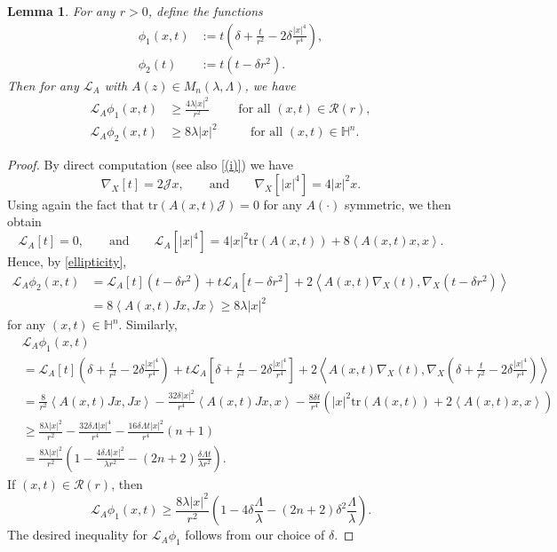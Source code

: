 \documentclass[12pt]{amsart}
\newtheorem{Lemma}[Theorem]{Lemma}
\newcommand{\Lop}{\mathcal{L}}
\newcommand{\J}{\mathcal{J}}
\def \tr {\mathrm{tr}}
\def \H {{\mathbb H}}
\def \L {\mathcal{L}}
\def \r {\mathcal R}
\def \tr {\mathrm{tr}}
\begin{document}
\begin{Lemma}\label{barriers}
For any $r>0$, define the functions
\begin{align*}
\phi_1(x,t) &:=t\left( \delta + \frac{t}{r^2} -2\delta \frac{|x|^4}{r^4}\right),\\
\phi_2(t)&:=t\left(t - \delta r^2 \right).
\end{align*}
Then for any $\L_A$ with $A(z) \in M_n(\lambda,\Lambda)$, we have
\begin{align*}
\Lop_A \phi_1(x,t)  &\geq \frac{4 \lambda |x|^2}{r^2} \qquad \text{ for all } (x,t) \in \r(r),\\
\Lop_A \phi_2(x,t) & \geq 8 \lambda |x|^2 \qquad\,\,\,\, \text{for all } (x,t) \in \H^n.
\end{align*}
\end{Lemma}
\begin{proof}
By direct computation (see also \eqref{(i)}) we have 
$$
\nabla_X [t]=2 \J x, \qquad \text{and} \qquad \nabla_X[|x|^4]=4 |x|^2 x.
$$
Using again the fact that $\tr(A(x,t) \J)=0$ for any $A(\cdot)$ symmetric, we then obtain
$$
\Lop_A [t]=0,  \qquad \text{and} \qquad\Lop_A\left[|x|^4\right]=4|x|^2\tr(A(x,t))+ 8\left\langle A(x,t)x,x\right\rangle.
$$
Hence, by \eqref{ellipticity},
\begin{align*}
\Lop_A \phi_2(x,t) & = \Lop_A[t] (t - \delta r^2) + t \Lop_A [t-\delta r^2] +2  \left\langle A(x,t) \nabla_X (t), \nabla_X (t-\delta r^2) \right\rangle \\
& = 8 \left\langle A(x,t) Jx, Jx \right\rangle \geq 8\lambda|x|^2
\end{align*}
for any $(x,t)\in \H^n$. Similarly,
\begin{align*}
&\Lop_A \phi_1(x,t) \\
& = \Lop_A [t]\left( \delta + \frac{t}{r^2} -2\delta \frac{|x|^4}{r^4}\right)+ t\Lop_A\left[ \delta + \frac{t}{r^2} -2\delta \frac{|x|^4}{r^4}\right] + 2 \left\langle A(x,t)\nabla_X (t), \nabla_X \left( \delta + \frac{t}{r^2} -2\delta \frac{|x|^4}{r^4}\right)\right\rangle\\
&=\frac{8}{r^2}\left\langle A(x,t)Jx,Jx\right\rangle - \frac{32\delta |x|^2}{r^4}\left\langle A(x,t)Jx,x\right\rangle -\frac{8\delta t}{r^4}\left(|x|^2\tr (A(x,t))+ 2\left\langle A(x,t)x,x\right\rangle\right)\\
&\geq \frac{8\lambda |x|^2}{r^2} - \frac{32\delta \Lambda |x|^4}{r^4}-\frac{16\delta \Lambda t |x|^2}{r^4}(n+1)\\
&=\frac{8\lambda |x|^2}{r^2}\left(1- \frac{4\delta \Lambda |x|^2}{\lambda r^2} - (2n+2)\frac{\delta \Lambda t}{\lambda r^2}\right).
\end{align*}
If $(x,t)\in \r(r)$, then
$$
\Lop_A \phi_1 (x,t)\geq \frac{8\lambda |x|^2}{r^2} \left(1- 4\delta \frac{\Lambda}{\lambda} - (2n+2)\delta^2 \frac{\Lambda }{\lambda}\right).
$$
The desired inequality for $\Lop_A \phi_1$ follows from our choice of $\delta$.
\end{proof} 
\end{document}
